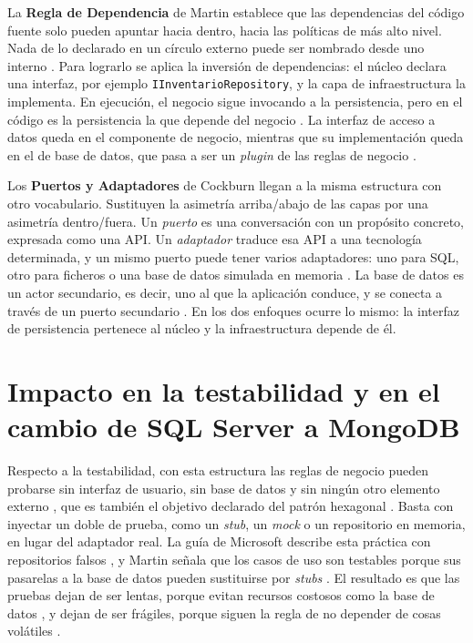La \textbf{Regla de Dependencia} de Martin establece que las dependencias del código fuente solo pueden apuntar hacia dentro, hacia las políticas de más alto nivel. Nada de lo declarado en un círculo externo puede ser nombrado desde uno interno . Para lograrlo se aplica la inversión de dependencias: el núcleo declara una interfaz, por ejemplo \texttt{IInventarioRepository}, y la capa de infraestructura la implementa. En ejecución, el negocio sigue invocando a la persistencia, pero en el código es la persistencia la que depende del negocio \citep[pp.~45, 206]{martin2017}. La interfaz de acceso a datos queda en el componente de negocio, mientras que su implementación queda en el de base de datos, que pasa a ser un \emph{plugin} de las reglas de negocio \citep[pp.~46, 168]{martin2017}.

Los \textbf{Puertos y Adaptadores} de Cockburn llegan a la misma estructura con otro vocabulario. Sustituyen la asimetría arriba/abajo de las capas por una asimetría dentro/fuera. Un \emph{puerto} es una conversación con un propósito concreto, expresada como una API. Un \emph{adaptador} traduce esa API a una tecnología determinada, y un mismo puerto puede tener varios adaptadores: uno para SQL, otro para ficheros o una base de datos simulada en memoria \citep[«Nature of the Solution»]{cockburn2005}. La base de datos es un actor secundario, es decir, uno al que la aplicación conduce, y se conecta a través de un puerto secundario \citep[«The Left-Right Asymmetry»]{cockburn2005}. En los dos enfoques ocurre lo mismo: la interfaz de persistencia pertenece al núcleo y la infraestructura depende de él.

\section{Impacto en la testabilidad y en el cambio de SQL Server a MongoDB}

Respecto a la testabilidad, con esta estructura las reglas de negocio pueden probarse sin interfaz de usuario, sin base de datos y sin ningún otro elemento externo , que es también el objetivo declarado del patrón hexagonal \citep[«Intent»]{cockburn2005}. Basta con inyectar un doble de prueba, como un \emph{stub}, un \emph{mock} o un repositorio en memoria, en lugar del adaptador real. La guía de Microsoft describe esta práctica con repositorios falsos , y Martin señala que los casos de uso son testables porque sus pasarelas a la base de datos pueden sustituirse por \emph{stubs} . El resultado es que las pruebas dejan de ser lentas, porque evitan recursos costosos como la base de datos , y dejan de ser frágiles, porque siguen la regla de no depender de cosas volátiles .

